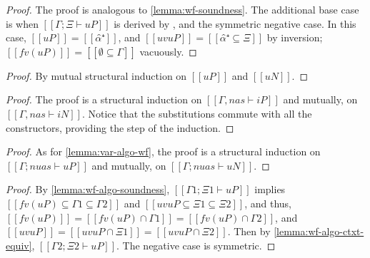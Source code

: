 \lemmaWfAlgoSoundness*
\begin{proof}
  The proof is analogous to \cref{lemma:wf-soundness}.
  The additional base case is when $[[Γ ; Ξ ⊢ uP]]$ is derived by ,
  and the symmetric negative case.
  In this case, $[[uP]] = [[α̂⁺]]$, and $[[uv uP]] = [[{α̂⁺} ⊆ Ξ]]$ by inversion; $[[fv(uP)]] = [[∅ ⊆ Γ]]$ vacuously.
\end{proof}

\lemmaWfAlgoCtxtEquiv*
\begin{proof}
  By mutual structural induction on $[[uP]]$ and $[[uN]]$.
\end{proof}

\lemmaVarAlgoWf*
\begin{proof}
  The proof is a structural induction on $[[Γ, nas ⊢ iP]]$ and mutually, on $[[Γ, nas ⊢ iN]]$.
  Notice that the substitutions commute with all the constructors,
  providing the step of the induction. 
\end{proof}

\lemmaVarDealgoWf*
\begin{proof}
  As for \cref{lemma:var-algo-wf}, the proof is a structural induction on 
  $[[Γ; {nuas} ⊢ uP]]$ and mutually, on $[[Γ; {nuas} ⊢ uN]]$.
\end{proof}

\corollaryWfWeakeningAlgo*
\begin{proof}
  By \cref{lemma:wf-algo-soundness},
  $[[Γ1; Ξ1 ⊢ uP]]$ implies $[[fv(uP) ⊆ Γ1 ⊆ Γ2]]$
  and $[[uv uP ⊆ Ξ1 ⊆ Ξ2]]$,
  and thus, $[[fv(uP)]] = [[fv(uP) ∩ Γ1]] = [[fv(uP) ∩ Γ2]]$, 
  and $[[uv uP]] = [[uv uP ∩ Ξ1]] = [[uv uP ∩ Ξ2]]$.
  Then by \cref{lemma:wf-algo-ctxt-equiv}, $[[Γ2; Ξ2 ⊢ uP]]$. 
  The negative case is symmetric.
\end{proof}